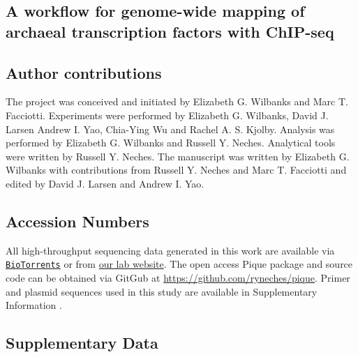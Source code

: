 \begin{refsection}

\chapter{A workflow for genome-wide mapping of archaeal transcription factors with ChIP-seq }


\section{Author contributions}

The project was conceived and initiated by Elizabeth G. Wilbanks and
Marc T. Facciotti. Experiments were performed by Elizabeth G.
Wilbanks, David J. Larsen Andrew I. Yao, Chia-Ying Wu and Rachel A. S.
Kjolby. Analysis was performed by Elizabeth G. Wilbanks and Russell Y.
Neches. Analytical tools were written by Russell Y. Neches. The
manuscript was written by Elizabeth G. Wilbanks with contributions
from Russell Y. Neches and Marc T. Facciotti and edited by David J.
Larsen and Andrew I. Yao.








\section{Accession Numbers}

All high-throughput sequencing data generated in this work are available via \href{http://www.biotorrents.net/details.php?id=259}{\tt BioTorrents} or from \href{http://www.bme.ucdavis.edu/facciotti/resources_data/data/}{our lab website}. The open access Pique package and source code can be obtained via GitGub at \url{https://github.com/ryneches/pique}. Primer and plasmid sequences used in this study are available in Supplementary Information .

\section{Supplementary Data}


\end{refsection}

